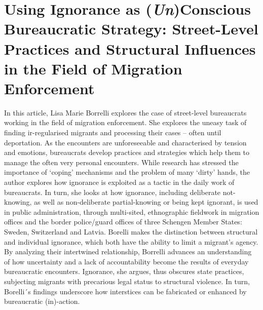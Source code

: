 \section{Using Ignorance as (\emph{Un})Conscious Bureaucratic Strategy: Street-Level Practices and Structural Influences in the Field of Migration Enforcement}
In this article, Lisa Marie Borrelli explores the case of street-level bureaucrats working in the field of migration enforcement. She explores the uneasy task of finding ir-regularised migrants and processing their cases – often until deportation. As the encounters are unforeseeable and characterised by tension and emotions, bureaucrats develop practices and strategies which help them to manage the often very personal encounters. While research has stressed the importance of ‘coping’ mechanisms and the problem of many ‘dirty’ hands, the author explores how ignorance is exploited as a tactic in the daily work of bureaucrats. In turn, she looks at how ignorance, including deliberate not-knowing, as well as non-deliberate partial-knowing or being kept ignorant, is used in public administration, through multi-sited, ethnographic fieldwork in migration offices and the border police/guard offices of three Schengen Member States: Sweden, Switzerland and Latvia. Borelli makes the distinction between structural and individual ignorance, which both have the ability to limit a migrant’s agency. By analyzing their intertwined relationship, Borrelli advances an understanding of how uncertainty and a lack of accountability become the results of everyday bureaucratic encounters. Ignorance, she argues, thus obscures state practices, subjecting migrants with precarious legal status to structural violence. In turn, Borelli´s findings underscore how interstices can be fabricated or enhanced by bureaucratic (in)-action.

